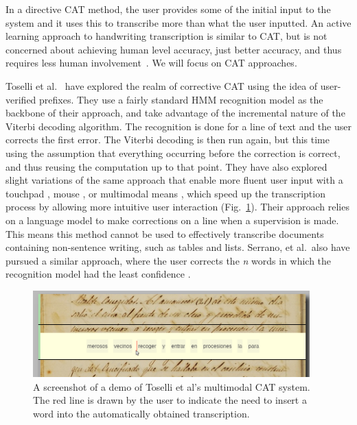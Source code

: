 \documentclass[ms,electronic,twosidetoc,letterpaper,chaptercenter,parttop,lof,lot]{byumsphd}
\begin{document}
In a directive CAT method, the user provides some of the initial input to the system and it uses this to transcribe more than what the user inputted.
An active learning approach to handwriting transcription is similar to CAT, but is not concerned about achieving human level accuracy, just better accuracy, and thus requires less human involvement~\cite{Serrano2010}. 
We will focus on CAT approaches.

Toselli et al.~\cite{Toselli2007} have explored the realm of corrective CAT using the idea of user-verified prefixes. They use a fairly standard HMM recognition model as the backbone of their approach, and take advantage of the incremental nature of the Viterbi decoding algorithm. The recognition is done for a line of text and the user corrects the first error. The Viterbi decoding is then run again, but this time using the assumption that everything occurring before the correction is correct, and thus reusing the computation up to that point. They have also explored slight variations of the same approach that enable more fluent user input with a touchpad \cite{Toselli2008}, mouse \cite{Toselli2009}, or multimodal means \cite{Toselli2010}, which speed up the transcription process by allowing more intuitive user interaction (Fig.~\ref{fig:Toselli_multimodalCAT}). Their approach relies on a language model to make corrections on a line when a supervision is made. This means this method cannot be used to effectively transcribe documents containing non-sentence writing, such as tables and lists. Serrano, et al.~also have pursued a similar approach, where the user corrects the \textit{n} words in which the recognition model had the least confidence \cite{Serrano2014}.

\begin{figure}
    \centering
    \includegraphics[width=0.95\textwidth]{Toselli_multimodalCAT}
    \caption{A screenshot of a demo of Toselli et al's multimodal CAT system. The red line is drawn by the user to indicate the need to insert a word into the automatically obtained transcription.}
    \label{fig:Toselli_multimodalCAT}
\end{figure}
\end{document}
